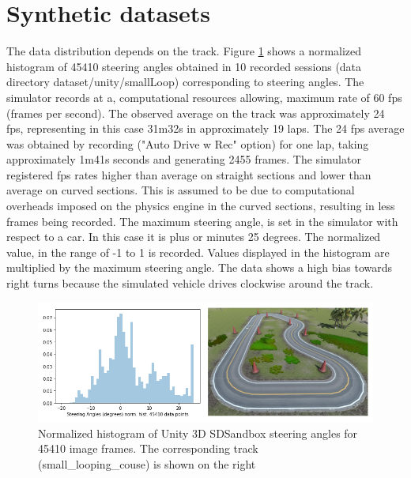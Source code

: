 
\section{Synthetic datasets}
The data distribution depends on the track. Figure \ref{fig:GeneratedTrackPlusHist} shows a normalized histogram of 45410 steering angles obtained in 10 recorded sessions (data directory dataset/unity/smallLoop) corresponding to steering angles. The simulator records at a, computational resources allowing, maximum rate of 60 fps (frames per second). The observed average on the track was approximately 24 fps, representing in this case 31m32s  in approximately 19 laps. The 24 fps average was obtained by recording ("Auto Drive w Rec" option) for one lap, taking approximately 1m41s seconds and generating 2455 frames. The simulator registered fps rates higher than average on straight sections and lower than average on curved sections. This is assumed to be due to computational overheads imposed on the physics engine in the curved sections, resulting in less frames being recorded. The maximum steering angle, is set in the simulator with respect to a car. In this case it is plus or minutes 25 degrees. The normalized value, in the range of -1 to 1 is recorded. Values displayed in the histogram are multiplied by the maximum steering angle. The data shows a high bias towards right turns because the simulated vehicle drives clockwise around the track.
\begin{figure}[ht]
 \centering 
 \includegraphics[width=\textwidth]{Figures/GeneratedTrackPlusHistogram.png}
 \caption{Normalized histogram of Unity 3D SDSandbox steering angles for 45410 image frames. The corresponding track (small\_looping\_couse) is shown on the right}
 \label{fig:GeneratedTrackPlusHist}
\end{figure}

